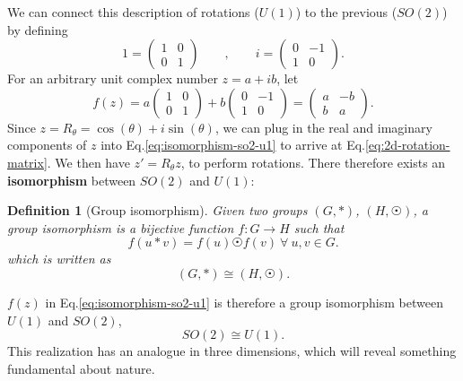 \documentclass[11pt]{article}
\numberwithin{equation}{section}
\newtheorem{defn}{Definition}[section]
\begin{document}
We can connect this description of rotations ($U(1)$) to the previous ($SO(2)$) by defining 
\begin{equation}
1 = \begin{pmatrix}
1 & 0\\
0 & 1
\end{pmatrix}\qquad,\qquad
i = \begin{pmatrix}
0 & -1\\
1 & 0
\end{pmatrix}. \label{eq:map-complex-rot-to-2d-vectors}
\end{equation}
For an arbitrary unit complex number $z = a + ib$, let
\begin{equation}
f(z) = a \begin{pmatrix}
1 & 0\\
0 & 1
\end{pmatrix} + b \begin{pmatrix}
0 & -1\\
1 & 0
\end{pmatrix} = \begin{pmatrix}
a & -b\\
b & a
\end{pmatrix}. \label{eq:isomorphism-so2-u1}
\end{equation}
Since $z = R_\theta = \cos(\theta) + i \sin(\theta)$, we can plug in the real and imaginary components of $z$ into Eq.\eqref{eq:isomorphism-so2-u1} to arrive at Eq.\eqref{eq:2d-rotation-matrix}. We then have $z' = R_\theta z$, to perform rotations. There therefore exists an \textbf{isomorphism} between $SO(2)$ and $U(1)$:
\begin{defn}[Group isomorphism]
Given two groups $(G, *)$, $(H, \astrosun)$, a group isomorphism is a bijective function $f: G \rightarrow H$ such that
\begin{equation}
f(u * v) = f(u) \astrosun f(v) \ \forall\ u, v \in G.
\end{equation}
which is written as
\begin{equation}
(G, *) \cong (H, \astrosun).
\end{equation}
\end{defn}
\noindent $f(z)$ in Eq.\eqref{eq:isomorphism-so2-u1} is therefore a group isomorphism between $U(1)$ and $SO(2)$,
\begin{equation}
SO(2) \cong U(1). \label{eq:so2-is-isomorphic-u1}
\end{equation}
This realization has an analogue in three dimensions, which will reveal something fundamental about nature.
\end{document}
